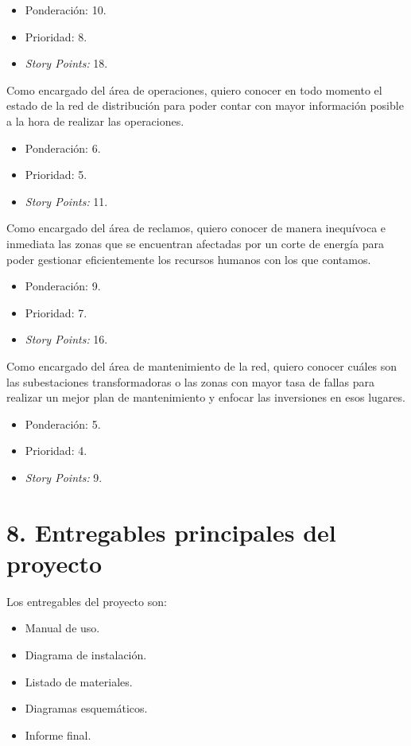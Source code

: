 \documentclass[
11pt, %
]{charter}
\begin{document}
\begin{itemize}
	\item Ponderación: 10.
	\item Prioridad: 8.
	\item \textit{Story Points:} 18.
\end{itemize}

Como encargado del área de operaciones, quiero conocer en todo momento el estado de la red de distribución para poder contar con mayor información posible a la hora de realizar las operaciones.

\begin{itemize}
	\item Ponderación: 6.
	\item Prioridad: 5.
	\item \textit{Story Points:} 11.
\end{itemize}

Como encargado del área de reclamos, quiero conocer de manera inequívoca e inmediata las zonas que se encuentran afectadas por un corte de energía para poder gestionar eficientemente los recursos humanos con los que contamos.

\begin{itemize}
	\item Ponderación: 9.
	\item Prioridad: 7.
	\item \textit{Story Points:} 16.
\end{itemize}

Como encargado del área de mantenimiento de la red, quiero conocer cuáles son las subestaciones transformadoras o las zonas con mayor tasa de fallas para realizar un mejor plan de mantenimiento y enfocar las inversiones en esos lugares.

\begin{itemize}
	\item Ponderación: 5.
	\item Prioridad: 4.
	\item \textit{Story Points:} 9.
\end{itemize}

\section{8. Entregables principales del proyecto}
\label{sec:entregables}

Los entregables del proyecto son:

\begin{itemize}
	\item Manual de uso.
	\item Diagrama de instalación.
	\item Listado de materiales.
	\item Diagramas esquemáticos.
	\item Informe final.
\end{itemize}
\end{document}
